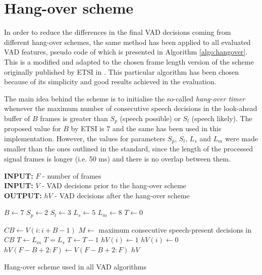 
\section{Hang-over scheme}
\label{sec:hang}

In order to reduce the differences in the final VAD decisions coming from different hang-over schemes, the same method has been applied to all evaluated VAD features, pseudo code of which is presented in Algorithm \ref{algo:hangover}. This is a modified and adapted to the chosen frame length version of the scheme originally published by ETSI in \cite{ETSIHangover}. This particular algorithm has been chosen because of its simplicity and good results achieved in the evaluation.

The main idea behind the scheme is to initialise the so-called \emph{hang-over timer} whenever the maximum number of consecutive speech decisions in the look-ahead buffer of $B$ frames is greater than $S_p$ (speech possible) or $S_l$ (speech likely). The proposed value for $B$ by ETSI is $7$ and the same has been used in this implementation. However, the values for parameters $S_p$, $S_l$, $L_s$ and $L_m$ were made smaller than the ones outlined in the standard, since the length of the processed signal frames is longer (i.e. 50 ms) and there is no overlap between them.

\begin{algorithm}
\textbf{INPUT:} $F$ - number of frames \\
\textbf{INPUT:} $V$ - VAD decisions prior to the hang-over scheme \\
\textbf{OUTPUT:} $hV$ - VAD decisions after the hang-over scheme
\begin{algorithmic}[1]
\STATE $B \leftarrow 7$ 
\STATE $S_p \leftarrow 2$  
\STATE $S_l \leftarrow 3$ 
\STATE $L_s \leftarrow 5$ 
\STATE $L_m \leftarrow 8$ 
\STATE
\STATE $T \leftarrow 0$ 

\STATE $CB \leftarrow V(i:i+B-1)$ 
\STATE $M \leftarrow$ maximum consecutive speech-present decisions in $CB$
\STATE $T \leftarrow L_m$
\STATE $T = L_s$
\STATE $T \leftarrow T-1$
\ENDIF
{}
\STATE $hV(i) \leftarrow 1$
\ELSE
\STATE $hV(i) \leftarrow 0$
\ENDIF
\ENDFOR
\STATE $hV(F-B+2:F) \leftarrow V(F-B+2:F)$ 
\RETURN $hV$
\end{algorithmic}
\caption{Hang-over scheme used in all VAD algorithms}
\label{algo:hangover}
\end{algorithm}

